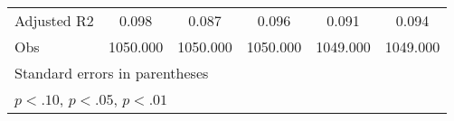 \begin{table}[htbp]
{\begin{tabular}{l*{5}{c}}
Adjusted R2     &\multicolumn{1}{c}{0.098}         &\multicolumn{1}{c}{0.087}         &\multicolumn{1}{c}{0.096}         &\multicolumn{1}{c}{0.091}         &\multicolumn{1}{c}{0.094}         \\
Obs             &\multicolumn{1}{c}{1050.000}         &\multicolumn{1}{c}{1050.000}         &\multicolumn{1}{c}{1050.000}         &\multicolumn{1}{c}{1049.000}         &\multicolumn{1}{c}{1049.000}         \\
\hline\hline
\multicolumn{6}{l}{\footnotesize Standard errors in parentheses}\\
\multicolumn{6}{l}{\footnotesize \sym{*} \(p<.10\), \sym{**} \(p<.05\), \sym{***} \(p<.01\)}\\
\end{tabular}}
\end{table}
